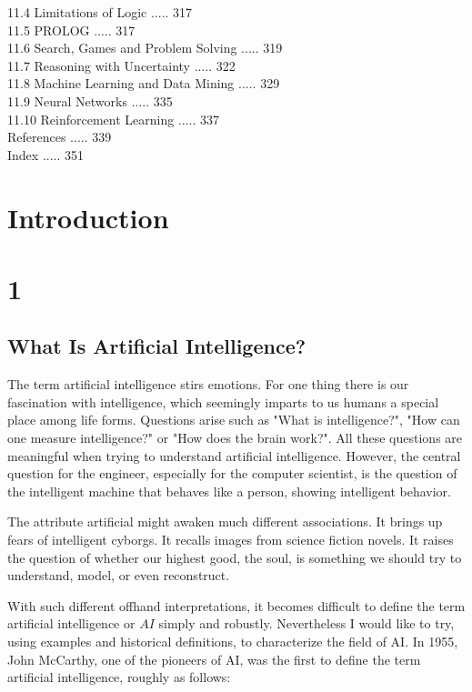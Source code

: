 \documentclass[10pt]{book}
\begin{document}
11.4 Limitations of Logic ..... 317\\
11.5 PROLOG ..... 317\\
11.6 Search, Games and Problem Solving ..... 319\\
11.7 Reasoning with Uncertainty ..... 322\\
11.8 Machine Learning and Data Mining ..... 329\\
11.9 Neural Networks ..... 335\\
11.10 Reinforcement Learning ..... 337\\
References ..... 339\\
Index ..... 351

\section*{Introduction}
\section*{1}
\subsection*{What Is Artificial Intelligence?}
The term artificial intelligence stirs emotions. For one thing there is our fascination with intelligence, which seemingly imparts to us humans a special place among life forms. Questions arise such as "What is intelligence?", "How can one measure intelligence?" or "How does the brain work?". All these questions are meaningful when trying to understand artificial intelligence. However, the central question for the engineer, especially for the computer scientist, is the question of the intelligent machine that behaves like a person, showing intelligent behavior.

The attribute artificial might awaken much different associations. It brings up fears of intelligent cyborgs. It recalls images from science fiction novels. It raises the question of whether our highest good, the soul, is something we should try to understand, model, or even reconstruct.

With such different offhand interpretations, it becomes difficult to define the term artificial intelligence or $A I$ simply and robustly. Nevertheless I would like to try, using examples and historical definitions, to characterize the field of AI. In 1955, John McCarthy, one of the pioneers of AI, was the first to define the term artificial intelligence, roughly as follows:
\end{document}
